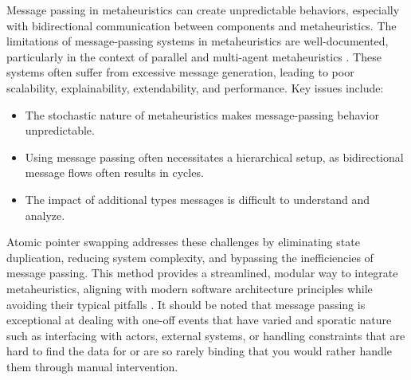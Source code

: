 Message passing in metaheuristics can create unpredictable behaviors, especially
with bidirectional communication between components and metaheuristics. The
limitations of message-passing systems in metaheuristics are well-documented,
particularly in the context of parallel and multi-agent metaheuristics
\citep{talbiMetaheuristicsDesignImplementation2009parallelchapter}. These systems often suffer
from excessive message generation, leading to poor scalability, explainability,
extendability, and performance. Key issues include:

\begin{itemize} 
	\item The stochastic nature
		of metaheuristics makes message-passing behavior unpredictable. 
	\item Using message passing often necessitates a
		hierarchical setup, as bidirectional message flows often results in cycles. 
	\item The
		impact of additional types messages is difficult to understand and analyze. 
\end{itemize}

Atomic pointer swapping addresses these challenges by eliminating state
duplication, reducing system complexity, and bypassing the inefficiencies of
message passing. This method provides a streamlined, modular way to integrate
metaheuristics, aligning with modern software architecture principles while
avoiding their typical pitfalls \citep{richards_fundamentals_2020}. It should
be noted that message passing is exceptional at dealing with one-off events that
have varied and sporatic nature such as interfacing with actors, external
systems, or handling constraints that are hard to find the data for or are 
so rarely binding that you would rather handle them through manual intervention.

